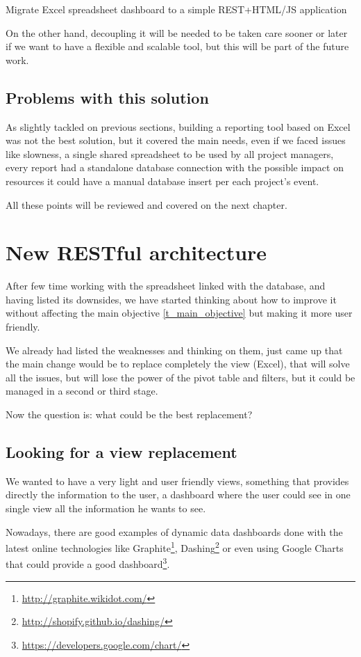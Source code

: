 \begin{part}{Migrate Excel spreadsheet dashboard to a simple REST+HTML/JS
application}


On the other hand, decoupling it will be needed to be taken care sooner or
later if we want to have a flexible and scalable tool, but this will be part of the
future work.

\section{Problems with this solution}
As slightly tackled on previous sections, building a reporting tool based on
Excel was not the best solution, but it covered the main needs, even if we
faced issues like slowness, a single shared spreadsheet to be used by all
project managers, every report had a standalone database connection with the
possible impact on resources it could have a manual database insert per
each project's event.

All these points will be reviewed and covered on the next chapter. 

\chapter{New RESTful architecture}
After few time working with the spreadsheet linked with the database, and having
listed its downsides, we have started thinking about how to improve it without
affecting the main objective \ref{t_main_objective} but making it more
user friendly.

We already had listed the weaknesses and thinking on them, just came
up that the main change would be to replace completely the view (Excel), that
will solve all the issues, but will lose the power of the pivot table and
filters, but it could be managed in a second or third stage.

Now the question is: what could be the best replacement?

\section{Looking for a view replacement}
We wanted to have a very light and user friendly views, something that
provides directly the information to the user, a dashboard where the user could
see in one single view all the information he wants to see.

Nowadays, there are good examples of dynamic data dashboards done with the
latest online technologies like
Graphite\footnote{\url{http://graphite.wikidot.com/}},
Dashing\footnote{\url{http://shopify.github.io/dashing/}} or even using Google
Charts that could provide a good
dashboard\footnote{\url{https://developers.google.com/chart/}}.  


\end{part}
